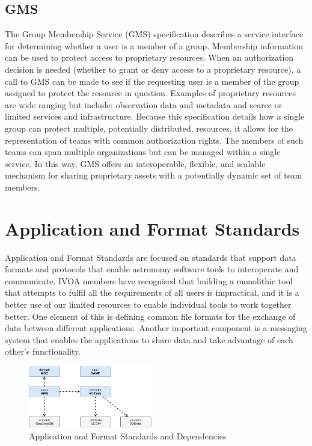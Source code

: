 \documentclass[11pt,letter]{ivoa}
\begin{document}
\subsection{GMS}

The Group Membership Service (GMS) \citep{2022ivoa.spec.0222M}
specification describes a service interface for determining 
whether a user is a member of a group. Membership information can be
used to protect access to
proprietary resources. When an authorization decision is needed (whether
to grant or deny access
to a proprietary resource), a call to GMS can be made to see if the
requesting user is a member
of the group assigned to protect the resource in question. Examples of
proprietary resources are
wide ranging but include: observation data and metadata and scarce or
limited services and
infrastructure. Because this specification details how a single group
can protect multiple,
potentially distributed, resources, it allows for the representation of
teams with common
authorization rights. The members of such teams can span multiple
organizations but can be
managed within a single service. In this way, GMS offers an
interoperable, flexible, and
scalable mechanism for sharing proprietary assets with a potentially
dynamic set of team members.

\section{Application and Format Standards}

Application and Format Standards are focused on standards that support
data formats and
protocols that enable astronomy software tools to interoperate and
communicate. IVOA
members have recognised that building a monolithic tool that attempts to
fulfil all the
requirements of all users is impractical, and it is a better use of our
limited resources
to enable individual tools to work together better. One element of this
is defining
common file formats for the exchange of data between different
applications. Another
important component is a messaging system that enables the applications
to share data
and take advantage of each other's functionality.

\begin{figure}[ht]
\centering
\includegraphics[width=0.48\textwidth]{ivoa-arch-apps.pdf}
\caption{Application and Format Standards and Dependencies}
\label{fig:appsdeps}
\end{figure}
\end{document}
